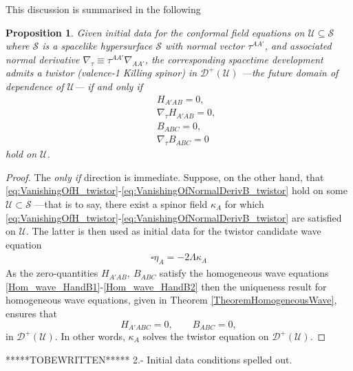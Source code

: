 \documentclass[10pt,a4paper]{article}
\theoremstyle{plain}
\newtheorem{proposition}{Proposition}
\begin{document}
{This discussion is summarised in the following
\begin{proposition}\label{Prop:Propagation_twistor}
  Given initial data for the conformal field equations on $\mathcal{U}\subseteq\mathcal{S}$
  where $\mathcal{S}$ is a spacelike
hypersurface $\mathcal{S}$ with normal vector $\tau^{AA'}$, and
associated normal derivative $\nabla_\tau \equiv
\tau^{AA'}\nabla_{AA'}$, the corresponding spacetime development
admits a twistor (valence-1 Killing spinor) in $\mathcal{D}^{+}(\mathcal{U})$ ---the future domain of dependence of $\mathcal{U}$---  if and only if
\begin{subequations}
\begin{eqnarray}
  && H_{A'AB}=0,\label{eq:VanishingOfH_twistor}\\ && \nabla_\tau
  H_{A'AB}=0,\label{eq:VanishingOfNormalDerivH_twistor}\\ &&
  B_{ABC}=0,\label{eq:VanishingOfB_twistor}\\ &&\nabla_\tau
  B_{ABC}=0 \label{eq:VanishingOfNormalDerivB_twistor}
\end{eqnarray}
\end{subequations}
 hold on $\mathcal{U}$.
\end{proposition}
\begin{proof}
The \emph{only if} direction is immediate. Suppose, on the other hand,
that
\eqref{eq:VanishingOfH_twistor}-\eqref{eq:VanishingOfNormalDerivB_twistor}
hold on some $\mathcal{U}\subset\mathcal{S}$ ---that is to say, there
exist a spinor field $\kappa_{A}$ for which
\eqref{eq:VanishingOfH_twistor}-\eqref{eq:VanishingOfNormalDerivB_twistor}
are satisfied on $\mathcal{U}$. The latter is then used as initial
data for the twistor candidate wave equation
\begin{align} \label{Wave_eq_twistor_candidate_prop}
\square \eta _{A} = -2 \Lambda \kappa _{A}
\end{align}
As the zero-quantities $H_{A'AB},~B_{ABC}$ satisfy the homogeneous
wave equations \eqref{Hom_wave_HandB1}-\eqref{Hom_wave_HandB2} then
the uniqueness result for homogeneous wave equations, given in
Theorem \ref{TheoremHomogeneousWave},
ensures that
\[ H_{A'ABC}=0,\qquad B_{ABC}=0,\]
in $\mathcal{D}^{+}(\mathcal{U})$. In other words,
$\kappa_{A}$ solves the twistor equation on $\mathcal{D}^{+}(\mathcal{U})$.
\end{proof}

\medskip

*****TOBEWRITTEN*****
2.- Initial data conditions spelled out.

}
\end{document}
